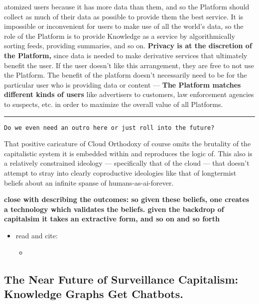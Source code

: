 atomized users because it has more data than them, and so the Platform
should collect as much of their data as possible to provide them the
best service. It is impossible or inconvenient for users to make use of
all the world's data, so the role of the Platform is to provide
Knowledge as a service by algorithmically sorting feeds, providing
summaries, and so on. \textbf{Privacy is at the discretion of the
Platform,} since data is needed to make derivative services that
ultimately benefit the user. If the user doesn't like this arrangement,
they are free to not use the Platform. The benefit of the platform
doesn't necessarily need to be for the particular user who is providing
data or content --- \textbf{The Platform matches different kinds of
users} like advertisers to customers, law enforcement agencies to
suspects, etc. in order to maximize the overall value of all Platforms.

\begin{center}\rule{0.5\linewidth}{0.5pt}\end{center}

\begin{verbatim}
Do we even need an outro here or just roll into the future?
\end{verbatim}

That positive caricature of Cloud Orthodoxy of course omits the
brutality of the capitalistic system it is embedded within and
reproduces the logic of. This also is a relatively constrained ideology
--- specifically that of the cloud --- that doesn't attempt to stray
into clearly coproductive ideologies like that of longtermist beliefs
about an infinite spanse of humans-as-ai-forever.

\textbf{close with describing the outcomes: so given these beliefs, one
creates a technology which validates the beliefs. given the backdrop of
capitalsim it takes an extractive form, and so on and so forth}

\begin{itemize}

\item
  read and cite:

  \begin{itemize}
  
  \item
    \cite{allhutterWorkingOntologistsHighQuality2019} 
  \end{itemize}
\end{itemize}

\hypertarget{the-near-future-of-surveillance-capitalism-knowledge-graphs-get-chatbots.}{%
\subsection{The Near Future of Surveillance Capitalism: Knowledge Graphs
Get
Chatbots.}\label{the-near-future-of-surveillance-capitalism-knowledge-graphs-get-chatbots.}}

